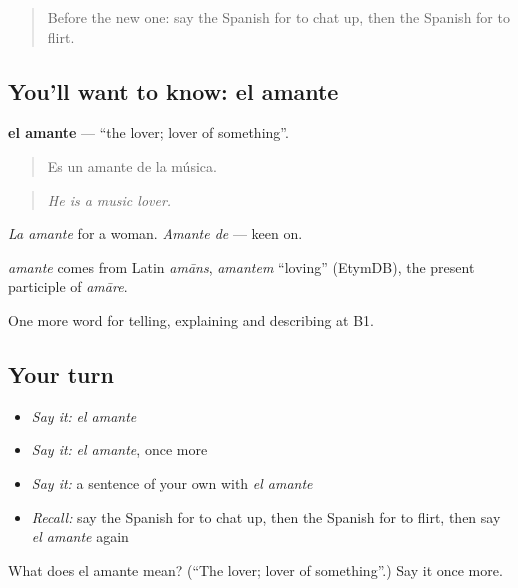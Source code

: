 \label{lesson:ES-C746-amante}



\begin{quote}
Before the new one: say the Spanish for to chat up, then the Spanish for to flirt.
\end{quote}

\subsection*{You'll want to know: el amante}
\textbf{el amante} — \textquotedblleft{}the lover; lover of something\textquotedblright{}.

\begin{quote}
Es un amante de la música.
\end{quote}

\begin{quote}
\emph{He is a music lover.}
\end{quote}

\emph{La amante} for a woman. \emph{Amante de} — keen on.

\begin{cousinweb}
\emph{amante} comes from Latin \emph{amāns}, \emph{amantem} \textquotedblleft{}loving\textquotedblright{} (EtymDB), the present participle of \emph{amāre}.
\end{cousinweb}

\begin{grammarlens}[title={What you've built}]
One more word for telling, explaining and describing at B1.
\end{grammarlens}

\subsection*{Your turn}
\begin{itemize}
\raggedright
  \item \emph{Say it:} \emph{el amante}
  \item \emph{Say it:} \emph{el amante}, once more
  \item \emph{Say it:} a sentence of your own with \emph{el amante}
  \item \emph{Recall:} say the Spanish for to chat up, then the Spanish for to flirt, then say \emph{el amante} again
\end{itemize}

\begin{tcolorbox}[breakable,colback=teal!4,colframe=teal!35!black,title={Before you move on}]
What does el amante mean? (\textquotedblleft{}The lover; lover of something\textquotedblright{}.) Say it once more.
\end{tcolorbox}
